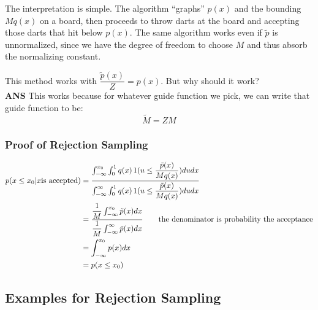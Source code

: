 \documentclass{article}
\begin{document}

The interpretation is simple. The algorithm ``graphs'' $p(x)$ and the bounding $Mq(x)$ on a board, then proceeds to throw darts at the board and accepting those darts that hit below $p(x)$. The same algorithm works even if $\tilde p$ is unnormalized, since we have the degree of freedom to choose $M$ and thus absorb the normalizing constant.

This method works with $\dfrac{\tilde{p}(x)}{Z} = p(x) $. But why should it work?\\
\textbf{ANS} This works because for whatever guide function we pick, we can write that guide function to be: \[
\widetilde{M} = ZM
\]

\subsubsection{Proof of Rejection Sampling}
\begin{align*}
p(x \leq x_0 |x \text{is accepted})
& = \dfrac{ \int_{-\infty}^{x_0} \int_0^1 q(x) \operatorname{1}(u \leq \dfrac{  \tilde{p}(x)  }{  Mq(x)  }) du dx }{ \int_{-\infty}^{\infty} \int_0^1 q(x) \operatorname{1}(u \leq \dfrac{\tilde{p}(x)}{Mq(x)}) du dx  } \\
& = \dfrac{    \dfrac{1}{M} \int_{-\infty}^{x_0} \tilde{p}(x) dx }{   \dfrac{1}{M}  \int_{-\infty}^{\infty}  \tilde{p}(x) dx } \qquad \text{the denominator is probability the acceptance} \\
& = \int_{-\infty}^{x_0} p(x) dx \\
& = p(x \leq x_0)
\end{align*}

\subsection{Examples for Rejection Sampling}
\end{document}
